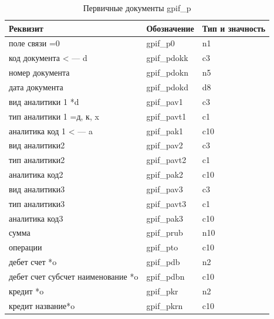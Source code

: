 \begin{table}[h!p]
    \centering
    \scriptsize
    \caption{Первичные документы gpif\_p}
    \begin{tabular}{|l|l|l|} 

                                                                                          \hline
\textbf{Реквизит}                   &\textbf{Обозначение}   &\textbf{Тип и значность}  \\ \hline
поле связи               =0         &gpif\_p0               &n1                        \\ \hline
код документа    < --- d            &gpif\_pdokk            &c3                        \\ \hline
номер документа                     &gpif\_pdokn            &n5                        \\ \hline
дата документа                      &gpif\_pdokd            &d8                        \\ \hline
вид аналитики 1    *d               &gpif\_pav1             &c3                        \\ \hline
тип аналитики 1      =д, к, x       &gpif\_pavt1            &c1                        \\ \hline
аналитика код 1   < --- a           &gpif\_pak1             &c10                       \\ \hline
вид аналитики2                      &gpif\_pav2             &c3                        \\ \hline
тип аналитики2                      &gpif\_pavt2            &c1                        \\ \hline
аналитика код2                      &gpif\_pak2             &c10                       \\ \hline
вид аналитики3                      &gpif\_pav3             &c3                        \\ \hline
тип аналитики3                      &gpif\_pavt3            &c1                        \\ \hline
аналитика код3                      &gpif\_pak3             &c10                       \\ \hline
сумма                               &gpif\_prub             &n10                       \\ \hline
операции                            &gpif\_pto              &c10                       \\ \hline
дебет счет *o                       &gpif\_pdb              &n2                        \\ \hline
дебет счет субсчет наименование *o  &gpif\_pdbn             &c10                       \\ \hline
кредит  *o                          &gpif\_pkr              &n2                        \\ \hline
кредит название*o                   &gpif\_pkrn             &c10                       \\ \hline

    \end{tabular}
\end{table}

